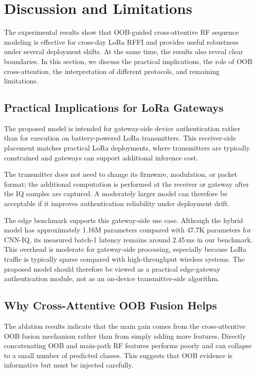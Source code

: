 \section{Discussion and Limitations}
\label{sec:discussion}

The experimental results show that OOB-guided cross-attentive RF sequence modeling is effective for cross-day LoRa RFFI and provides useful robustness under several deployment shifts. At the same time, the results also reveal clear boundaries. In this section, we discuss the practical implications, the role of OOB cross-attention, the interpretation of different protocols, and remaining limitations.

\subsection{Practical Implications for LoRa Gateways}

The proposed model is intended for gateway-side device authentication rather than for execution on battery-powered LoRa transmitters.
This receiver-side placement matches practical LoRa deployments, where transmitters are typically constrained and gateways can support additional inference cost.

The transmitter does not need to change its firmware, modulation, or packet format; the additional computation is performed at the receiver or gateway after the IQ samples are captured.
A moderately larger model can therefore be acceptable if it improves authentication reliability under deployment drift.

The edge benchmark supports this gateway-side use case. Although the hybrid model has approximately 1.16M parameters compared with 47.7K parameters for CNN-IQ, its measured batch-1 latency remains around 2.45\,ms in our benchmark. This overhead is moderate for gateway-side processing, especially because LoRa traffic is typically sparse compared with high-throughput wireless systems. The proposed model should therefore be viewed as a practical edge-gateway authentication module, not as an on-device transmitter-side algorithm.

\subsection{Why Cross-Attentive OOB Fusion Helps}

The ablation results indicate that the main gain comes from the cross-attentive OOB fusion mechanism rather than from simply adding more features. Directly concatenating OOB and main-path RF features performs poorly and can collapse to a small number of predicted classes. This suggests that OOB evidence is informative but must be injected carefully.

